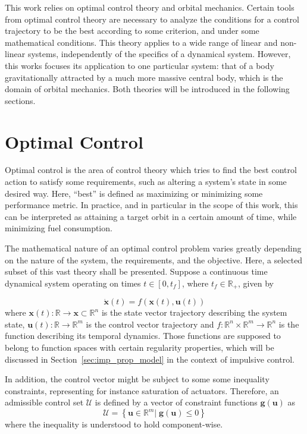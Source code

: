 
This work relies on optimal control theory and orbital mechanics. Certain tools from optimal control theory are necessary to analyze the conditions for a control trajectory to be the best according to some criterion, and under some mathematical conditions. This theory applies to a wide range of linear and non-linear systems, independently of the specifics of a dynamical system. However, this works focuses its application to one particular system: that of a body gravitationally attracted by a much more massive central body, which is the domain of orbital mechanics. Both theories will be introduced in the following sections.

\section{Optimal Control}

Optimal control is the area of control theory which tries to find the best control action to satisfy some requirements, such as altering a system's state in some desired way. Here, ``best''  is defined as maximizing or minimizing some performance metric. In practice, and in particular in the scope of this work, this can be interpreted as attaining a target orbit in a certain amount of time, while minimizing fuel consumption.

The mathematical nature of an optimal control problem varies greatly depending on the nature of the system, the requirements, and the objective. Here, a selected subset of this vast theory shall be presented. Suppose a continuous time dynamical system operating on times \(t \in [0, t_f]\), where \(t_f \in \mathbb{R}_+\), given by

\begin{equation} \label{eq:generic_dyn}
    \dot{\mathbf{x}}(t) = f(\mathbf{x}(t), \mathbf{u}(t))
\end{equation}
where \(\mathbf{x}(t): \mathbb{R} \rightarrow \mathcal{\mathbf{x}} \subset \mathbb{R}^n\) is the state vector trajectory describing the system state, \(\mathbf{u}(t): \mathbb{R} \rightarrow \mathbb{R}^m\) is the control vector trajectory and \(f: \mathbb{R}^n \times \mathbb{R}^m \rightarrow \mathbb{R}^n\) is the function describing its temporal dynamics. Those functions are supposed to belong to function spaces with certain regularity properties, which will be discussed in Section~\ref{sec:imp_prop_model} in the context of impulsive control.

In addition, the control vector might be subject to some some inequality constraints, representing for instance saturation of actuators. Therefore, an admissible control set \(\mathcal{U}\) is defined by a vector of constraint functions \(\mathbf{g}(\mathbf{u})\) as
\begin{equation}
    \mathcal{U} = \left\{\mathbf{u} \in \mathbb{R}^m |\; \mathbf{g}(\mathbf{u}) \leq 0\right\}
\end{equation}
where the inequality is understood to hold component-wise.

